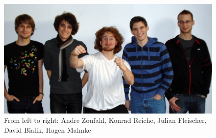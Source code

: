 \begin{figure}[H]
	\centering
		\includegraphics[width=\columnwidth]{images/team.jpg}
	\caption{\small From left to right: Andre Zoufahl, Konrad Reiche, Julian Fleischer, David Bialik, Hagen Mahnke}
	\label{fig:us}
\end{figure}
